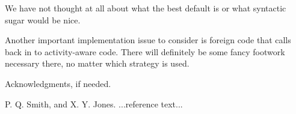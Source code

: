 \documentclass[10pt,preprint]{sigplanconf}
\begin{document}
We have not thought at all about what the best default is or what syntactic sugar would be nice.

Another important implementation issue to consider is foreign code that calls back in to activity-aware code.
There will definitely be some fancy footwork necessary there, no matter which strategy is used.

\acks

Acknowledgments, if needed.





\begin{thebibliography}{}
\softraggedright

P. Q. Smith, and X. Y. Jones. ...reference text...

\end{thebibliography}
\end{document}
